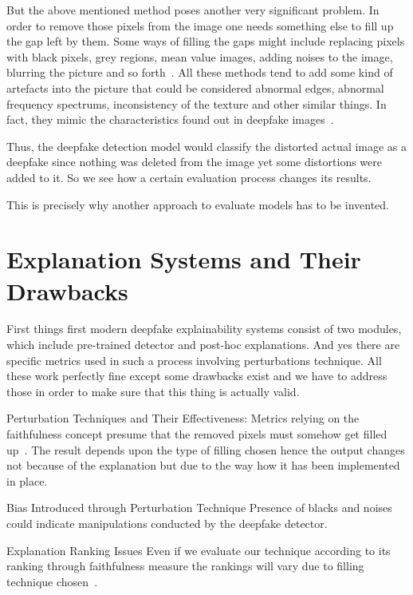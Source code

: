 \documentclass[12pt,a4wide]{report}
\theoremstyle{plain}
\theoremstyle{definition}
\theoremstyle{remark}
\begin{document}
But the above mentioned method poses another very significant problem. In order to remove those pixels from the image one needs something else to fill up the gap left by them. Some ways of filling the gaps might include replacing pixels with black pixels, grey regions, mean value images, adding noises to the image, blurring the picture and so forth~\cite{hooker2019roar, rong2022road}. All these methods tend to add some kind of artefacts into the picture that could be considered abnormal edges, abnormal frequency spectrums, inconsistency of the texture and other similar things. In fact, they mimic the characteristics found out in deepfake images~\cite{frank2020frequency, durall2020upconv}.


Thus, the deepfake detection model would classify the distorted actual image as a deepfake since nothing was deleted from the image yet some distortions were added to it. So we see how a certain evaluation process changes its results.


This is precisely why another approach to evaluate models has to be invented.



\section{ Explanation Systems and Their Drawbacks}
\label{sec:problem}

First things first modern deepfake explainability systems consist of two modules, which include pre-trained detector and post-hoc explanations. And yes there are specific metrics used in such a process involving perturbations technique. All these work perfectly fine except some drawbacks exist and we have to address those in order to make sure that this thing is actually valid.


Perturbation Techniques and Their Effectiveness:
Metrics relying on the faithfulness concept presume that the removed pixels must somehow get filled up~\cite{hooker2019roar, rong2022road}. The result depends upon the type of filling chosen hence the output changes not because of the explanation but due to the way how it has been implemented in place.

Bias Introduced through Perturbation Technique
Presence of blacks and noises could indicate manipulations conducted by the deepfake detector.

Explanation Ranking Issues
Even if we evaluate our technique according to its ranking through faithfulness measure the rankings will vary due to filling technique chosen~\cite{tomsett2020sanity, rong2022road}.
\end{document}
